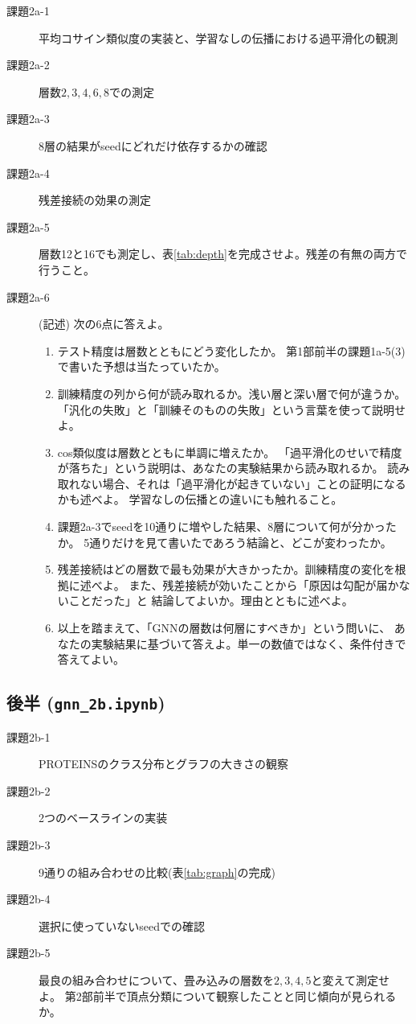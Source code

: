 \documentclass[11pt,a4paper]{jsarticle}
\begin{document}
\begin{description}
\item[課題2a-1] 平均コサイン類似度の実装と、学習なしの伝播における過平滑化の観測
\item[課題2a-2] 層数$2,3,4,6,8$での測定
\item[課題2a-3] 8層の結果がseedにどれだけ依存するかの確認
\item[課題2a-4] 残差接続の効果の測定
\item[課題2a-5] 層数12と16でも測定し、表\ref{tab:depth}を完成させよ。残差の有無の両方で行うこと。
\item[課題2a-6] (記述) 次の6点に答えよ。
  \begin{enumerate}
  \item テスト精度は層数とともにどう変化したか。
    第1部前半の課題1a-5(3)で書いた予想は当たっていたか。
  \item 訓練精度の列から何が読み取れるか。浅い層と深い層で何が違うか。
    「汎化の失敗」と「訓練そのものの失敗」という言葉を使って説明せよ。
  \item cos類似度は層数とともに単調に増えたか。
    「過平滑化のせいで精度が落ちた」という説明は、あなたの実験結果から読み取れるか。
    読み取れない場合、それは「過平滑化が起きていない」ことの証明になるかも述べよ。
    学習なしの伝播との違いにも触れること。
  \item 課題2a-3でseedを10通りに増やした結果、8層について何が分かったか。
    5通りだけを見て書いたであろう結論と、どこが変わったか。
  \item 残差接続はどの層数で最も効果が大きかったか。訓練精度の変化を根拠に述べよ。
    また、残差接続が効いたことから「原因は勾配が届かないことだった」と
    結論してよいか。理由とともに述べよ。
  \item 以上を踏まえて、「GNNの層数は何層にすべきか」という問いに、
    あなたの実験結果に基づいて答えよ。単一の数値ではなく、条件付きで答えてよい。
  \end{enumerate}
\end{description}

\subsection*{後半 (\texttt{gnn\_2b.ipynb})}

\begin{description}
\item[課題2b-1] PROTEINSのクラス分布とグラフの大きさの観察
\item[課題2b-2] 2つのベースラインの実装
\item[課題2b-3] 9通りの組み合わせの比較(表\ref{tab:graph}の完成)
\item[課題2b-4] 選択に使っていないseedでの確認
\item[課題2b-5] 最良の組み合わせについて、畳み込みの層数を$2,3,4,5$と変えて測定せよ。
  第2部前半で頂点分類について観察したことと同じ傾向が見られるか。
\end{description}
\end{document}
